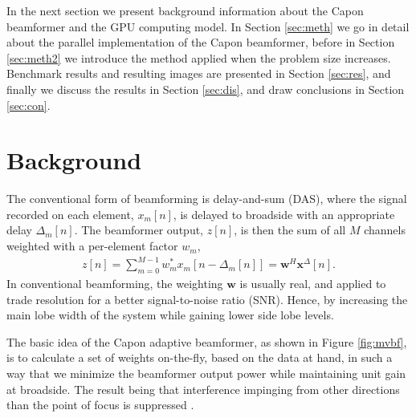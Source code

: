 \documentclass[journal]{IEEEtran}
\renewcommand{\vec}[1]{\mathbf{#1}}
\begin{document}
In the next section we present background information about the Capon beamformer and the GPU computing model. In Section \ref{sec:meth} we go in detail about the parallel implementation of the Capon beamformer, before in Section \ref{sec:meth2} we introduce the method applied when the problem size increases. Benchmark results and resulting images are presented in Section \ref{sec:res}, and finally we discuss the results in Section \ref{sec:dis}, and draw conclusions in Section \ref{sec:con}. 

\section{Background}







The conventional form of beamforming is delay-and-sum (DAS), where the signal recorded on each element, $x_m[n]$, is delayed to broadside with an appropriate delay $\Delta_m[n]$. The beamformer output, $z[n]$, is then the sum of all $M$ channels weighted with a per-element factor $w_m$,
\begin{align}
z[n] = \sum_{m = 0}^{M-1}w_m^*x_m[n - \Delta_m[n]] = \vec{w}^H\vec{x}^{\Delta}[n]. \label{eq:z}
\end{align}
In conventional beamforming, the weighting $\vec{w}$ is usually real, and applied to trade resolution for a better signal-to-noise ratio (SNR). Hence, by increasing the main lobe width of the system while gaining lower side lobe levels. 

The basic idea of the Capon adaptive beamformer, as shown in Figure \ref{fig:mvbf}, is to calculate a set of weights on-the-fly, based on the data at hand, in such a way that we minimize the beamformer output power while maintaining unit gain at broadside. The result being that interference impinging from other directions than the point of focus is suppressed \cite{Synnevag2007}.
\end{document}
